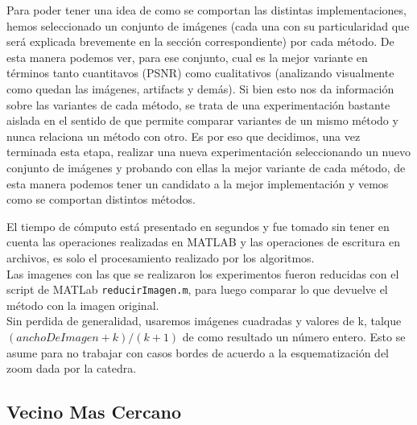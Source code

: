 \documentclass[a4paper]{article}
\begin{document}
Para poder tener una idea de como se comportan las distintas implementaciones, hemos seleccionado un conjunto de imágenes (cada una con su particularidad que será explicada brevemente en la sección correspondiente) por cada método. De esta manera podemos ver, para ese conjunto, cual es la mejor variante en términos tanto cuantitavos (PSNR) como cualitativos (analizando visualmente como quedan las imágenes, artifacts y demás). Si bien esto nos da información sobre las variantes de cada método, se trata de una experimentación bastante aislada en el sentido de que permite comparar variantes de un mismo método y nunca relaciona un método con otro. Es por eso que decidimos, una vez terminada esta etapa, realizar una nueva experimentación seleccionando un nuevo conjunto de imágenes y probando con ellas la mejor variante de cada método, de esta manera podemos tener un candidato a la mejor implementación y vemos como se comportan distintos métodos.
\par El tiempo de cómputo está presentado en segundos y fue tomado sin tener en cuenta las operaciones realizadas en MATLAB y las operaciones de escritura en archivos, es solo el procesamiento realizado por los algoritmos.\\
Las imagenes con las que se realizaron los experimentos fueron reducidas con el script de MATLab \texttt{reducirImagen.m}, para luego comparar lo que devuelve el m\'etodo con la imagen original.\\
 Sin perdida de generalidad, usaremos im\'agenes cuadradas y valores de k,  talque $(anchoDeImagen + k) / (k + 1)$ de como resultado un n\'umero entero. Esto se asume para no trabajar con casos bordes de acuerdo a la esquematizaci\'on del zoom dada por la catedra.


\subsection{Vecino Mas Cercano}
\end{document}
